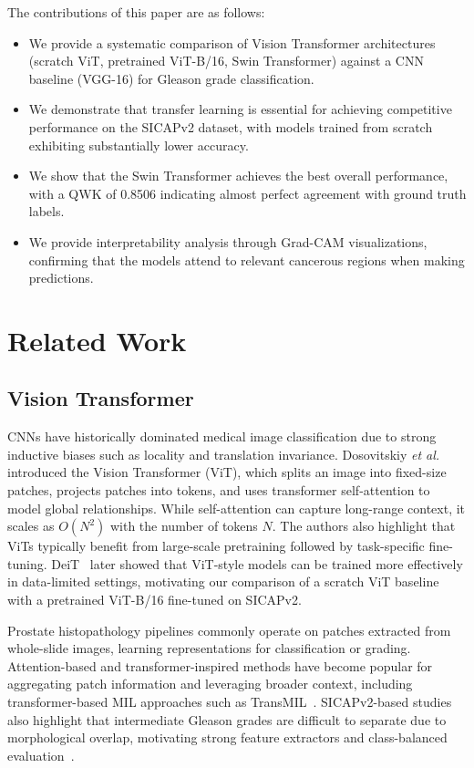 \documentclass[conference]{IEEEtran}
\begin{document}
The contributions of this paper are as follows:
\begin{itemize}
    \item We provide a systematic comparison of Vision Transformer architectures (scratch ViT, pretrained ViT-B/16, Swin Transformer) against a CNN baseline (VGG-16) for Gleason grade classification.
    \item We demonstrate that transfer learning is essential for achieving competitive performance on the SICAPv2 dataset, with models trained from scratch exhibiting substantially lower accuracy.
    \item We show that the Swin Transformer achieves the best overall performance, with a QWK of 0.8506 indicating almost perfect agreement with ground truth labels.
    \item We provide interpretability analysis through Grad-CAM visualizations, confirming that the models attend to relevant cancerous regions when making predictions.
\end{itemize}


\section{\textbf{Related Work}}


\subsection{\textbf{Vision Transformer}}
CNNs have historically dominated medical image classification due to strong inductive biases such as locality and translation invariance. Dosovitskiy \emph{et al.}~\cite{ViT} introduced the Vision Transformer (ViT), which splits an image into fixed-size patches, projects patches into tokens, and uses transformer self-attention to model global relationships. While self-attention can capture long-range context, it scales as $O(N^2)$ with the number of tokens $N$. The authors also highlight that ViTs typically benefit from large-scale pretraining followed by task-specific fine-tuning. DeiT~\cite{DeiT} later showed that ViT-style models can be trained more effectively in data-limited settings, motivating our comparison of a scratch ViT baseline with a pretrained ViT-B/16 fine-tuned on SICAPv2.


Prostate histopathology pipelines commonly operate on patches extracted from whole-slide images, learning representations for classification or grading. Attention-based and transformer-inspired methods have become popular for aggregating patch information and leveraging broader context, including transformer-based MIL approaches such as TransMIL~\cite{TransMIL}. SICAPv2-based studies also highlight that intermediate Gleason grades are difficult to separate due to morphological overlap, motivating strong feature extractors and class-balanced evaluation~\cite{SICAPv2_SciRep}.
\end{document}

